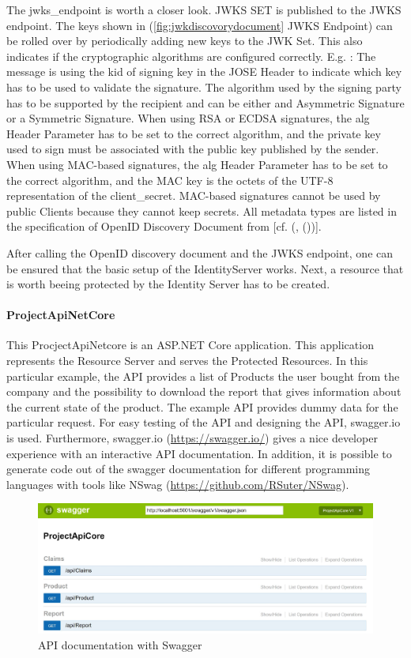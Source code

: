 The jwks\_endpoint is worth a closer look. JWKS SET is published to the JWKS endpoint. The keys shown in (\ref{fig:jwkdiscovorydocument} JWKS Endpoint) can be rolled over by periodically adding new keys to the JWK Set. This also indicates if the cryptographic algorithms are configured correctly. E.g. : The message is using the kid of signing key in the JOSE Header to indicate which key has to be used to validate the signature. The algorithm used by the signing party has to be supported by the recipient and can be either and Asymmetric Signature or a Symmetric Signature. 
When using RSA or ECDSA signatures, the alg Header Parameter has to be set to the correct algorithm, and the private key used to sign must be associated with the public key published by the sender. When using MAC-based signatures, the alg Header Parameter has to be set to the correct algorithm, and the MAC key is the octets of the UTF-8 representation of the client\_secret. MAC-based signatures cannot be used by public Clients because they cannot keep secrets.  All metadata types are listed in the specification of OpenID Discovery Document from \cite{Sakimura:OIDCD} [cf. (\cite{Sakimura:OIDCC}, (\cite{Sakimura:OIDCD}))]. 

After calling the OpenID discovery document and the JWKS endpoint, one can be ensured that the basic setup of the IdentityServer works. Next, a resource that is worth beeing protected by the Identity Server has to be created. 

\paragraph{ProjectApiNetCore}

This ProcjectApiNetcore is an ASP.NET Core application. This application represents the Resource Server and serves the Protected Resources. In this particular example, the API provides a list of Products the user bought from the company and the possibility to download the report that gives information about the current state of the product. The example API provides dummy data for the particular request. For easy testing of the API and designing the API, swagger.io is used. Furthermore, swagger.io (\url{https://swagger.io/}) gives a nice developer experience with an interactive API documentation. In addition, it is possible to generate code out of the swagger documentation for different programming languages with tools like NSwag (\url{https://github.com/RSuter/NSwag}).

\begin{figure}[h]
	\centering
	\includegraphics[width=0.7\linewidth]{images/apis}
	\caption{API documentation with Swagger}
	\label{fig:apis}
\end{figure}

